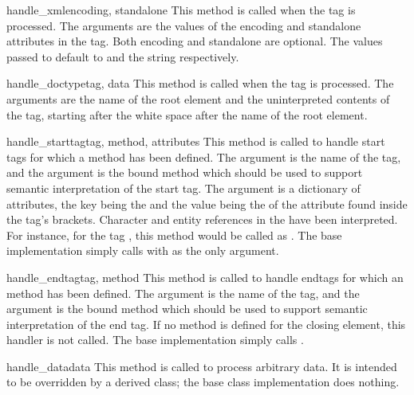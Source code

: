 \begin{funcdesc}{handle_xml}{encoding, standalone}
This method is called when the  tag is processed.
The arguments are the values of the encoding and standalone attributes 
in the tag.  Both encoding and standalone are optional.  The values
passed to  default to  and the string
 respectively.
\end{funcdesc}

\begin{funcdesc}{handle_doctype}{tag, data}
This method is called when the  tag is processed.
The arguments are the name of the root element and the uninterpreted
contents of the tag, starting after the white space after the name of
the root element.
\end{funcdesc}

\begin{funcdesc}{handle_starttag}{tag, method, attributes}
This method is called to handle start tags for which a
 method has been defined.  The 
argument is the name of the tag, and the  argument is the
bound method which should be used to support semantic interpretation
of the start tag.  The  argument is a dictionary of
attributes, the key being the  and the value being the
 of the attribute found inside the tag's \code{<>} brackets.
Character and entity references in the  have
been interpreted.  For instance, for the tag
, this method would be called as
.
The base implementation simply calls  with 
as the only argument.
\end{funcdesc}

\begin{funcdesc}{handle_endtag}{tag, method}
This method is called to handle endtags for which an
 method has been defined.  The 
argument is the name of the tag, and the
 argument is the bound method which should be used to
support semantic interpretation of the end tag.  If no
 method is defined for the closing element, this
handler is not called.  The base implementation simply calls
.
\end{funcdesc}

\begin{funcdesc}{handle_data}{data}
This method is called to process arbitrary data.  It is intended to be
overridden by a derived class; the base class implementation does
nothing.
\end{funcdesc}

